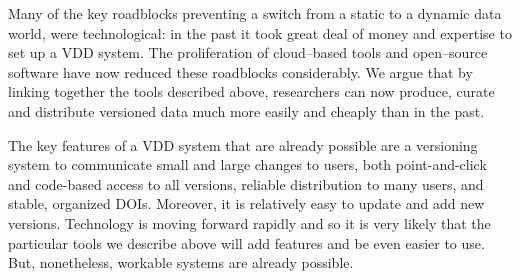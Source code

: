 \documentclass[a4paper,11pt]{article}
\begin{document}
Many of the key roadblocks preventing a switch from a static to a dynamic data world, were technological: in the past it took great deal of money and expertise to set up a VDD system. The proliferation of cloud--based tools and open--source software have now reduced these roadblocks considerably.  We argue that by linking together the tools described above, researchers can now produce, curate and distribute versioned data much more easily and cheaply than in the past.  

The key features of a VDD system that are already possible are a versioning system to communicate small and large changes to users, both point-and-click and code-based access to all versions, reliable distribution to many users, and stable, organized DOIs.  Moreover, it is relatively easy to update and add new versions.  Technology is moving forward rapidly and so it is very likely that the particular tools we describe above will add features and be even easier to use.  But, nonetheless, workable systems are already possible.  



%
%
\end{document}
